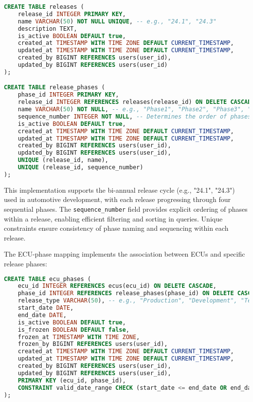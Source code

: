 \begin{lstlisting}[language=SQL, caption={Release and Phase Table Implementation}, label={lst:release-phase-tables}]
CREATE TABLE releases (
    release_id INTEGER PRIMARY KEY,
    name VARCHAR(50) NOT NULL UNIQUE, -- e.g., "24.1", "24.3"
    description TEXT,
    is_active BOOLEAN DEFAULT true,
    created_at TIMESTAMP WITH TIME ZONE DEFAULT CURRENT_TIMESTAMP,
    updated_at TIMESTAMP WITH TIME ZONE DEFAULT CURRENT_TIMESTAMP,
    created_by BIGINT REFERENCES users(user_id),
    updated_by BIGINT REFERENCES users(user_id)
);

CREATE TABLE release_phases (
    phase_id INTEGER PRIMARY KEY,
    release_id INTEGER REFERENCES releases(release_id) ON DELETE CASCADE,
    name VARCHAR(50) NOT NULL, -- e.g., "Phase1", "Phase2", "Phase3", "Phase4"
    sequence_number INTEGER NOT NULL, -- Determines the order of phases
    is_active BOOLEAN DEFAULT true,
    created_at TIMESTAMP WITH TIME ZONE DEFAULT CURRENT_TIMESTAMP,
    updated_at TIMESTAMP WITH TIME ZONE DEFAULT CURRENT_TIMESTAMP,
    created_by BIGINT REFERENCES users(user_id),
    updated_by BIGINT REFERENCES users(user_id),
    UNIQUE (release_id, name),
    UNIQUE (release_id, sequence_number)
);
\end{lstlisting}

This implementation supports the bi-annual release cycle (e.g., "24.1", "24.3") used in automotive development, with each release progressing through four sequential phases. The \texttt{sequence\_number} field provides explicit ordering of phases within a release, enabling efficient filtering and sorting in queries. Unique constraints ensure consistency of phase naming and sequencing within each release.

The ECU-phase mapping implements the association between ECUs and specific release phases:

\begin{lstlisting}[language=SQL, caption={ECU-Phase Mapping Implementation}, label={lst:ecu-phase-mapping}]
CREATE TABLE ecu_phases (
    ecu_id INTEGER REFERENCES ecus(ecu_id) ON DELETE CASCADE,
    phase_id INTEGER REFERENCES release_phases(phase_id) ON DELETE CASCADE,
    release_type VARCHAR(50), -- e.g., "Production", "Development", "Test"
    start_date DATE,
    end_date DATE,
    is_active BOOLEAN DEFAULT true,
    is_frozen BOOLEAN DEFAULT false,
    frozen_at TIMESTAMP WITH TIME ZONE,
    frozen_by BIGINT REFERENCES users(user_id),
    created_at TIMESTAMP WITH TIME ZONE DEFAULT CURRENT_TIMESTAMP,
    updated_at TIMESTAMP WITH TIME ZONE DEFAULT CURRENT_TIMESTAMP,
    created_by BIGINT REFERENCES users(user_id),
    updated_by BIGINT REFERENCES users(user_id),
    PRIMARY KEY (ecu_id, phase_id),
    CONSTRAINT valid_date_range CHECK (start_date <= end_date OR end_date IS NULL)
);
\end{lstlisting}

